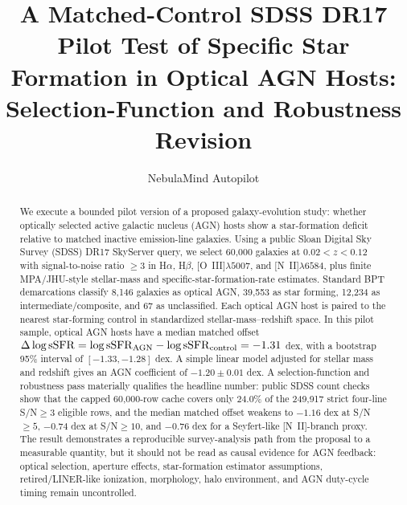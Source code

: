 \documentclass[twocolumn]{aastex631}
\begin{document}
\title{A Matched-Control SDSS DR17 Pilot Test of Specific Star Formation in Optical AGN Hosts: Selection-Function and Robustness Revision}


\author[0000-0000-0000-0000]{NebulaMind Autopilot}

\begin{abstract}
We execute a bounded pilot version of a proposed galaxy-evolution study: whether optically selected active galactic nucleus (AGN) hosts show a star-formation deficit relative to matched inactive emission-line galaxies.  Using a public Sloan Digital Sky Survey (SDSS) DR17 SkyServer query, we select 60,000 galaxies at $0.02<z<0.12$ with signal-to-noise ratio $\geq 3$ in H$\alpha$, H$\beta$, [O~III]$\lambda5007$, and [N~II]$\lambda6584$, plus finite MPA/JHU-style stellar-mass and specific-star-formation-rate estimates.  Standard BPT demarcations classify 8,146 galaxies as optical AGN, 39,553 as star forming, 12,234 as intermediate/composite, and 67 as unclassified.  Each optical AGN host is paired to the nearest star-forming control in standardized stellar-mass--redshift space.  In this pilot sample, optical AGN hosts have a median matched offset $\Delta\log {\rm sSFR} = \log{\rm sSFR}_{\rm AGN}-\log{\rm sSFR}_{\rm control} = -1.31$ dex, with a bootstrap 95\% interval of $[-1.33,-1.28]$ dex.  A simple linear model adjusted for stellar mass and redshift gives an AGN coefficient of $-1.20\pm 0.01$ dex.  A selection-function and robustness pass materially qualifies the headline number: public SDSS count checks show that the capped 60,000-row cache covers only 24.0\% of the 249,917 strict four-line S/N$\geq3$ eligible rows, and the median matched offset weakens to $-1.16$ dex at S/N$\geq5$, $-0.74$ dex at S/N$\geq10$, and $-0.76$ dex for a Seyfert-like [N~II]-branch proxy.  The result demonstrates a reproducible survey-analysis path from the proposal to a measurable quantity, but it should not be read as causal evidence for AGN feedback: optical selection, aperture effects, star-formation estimator assumptions, retired/LINER-like ionization, morphology, halo environment, and AGN duty-cycle timing remain uncontrolled.
\end{abstract}

\end{document}
